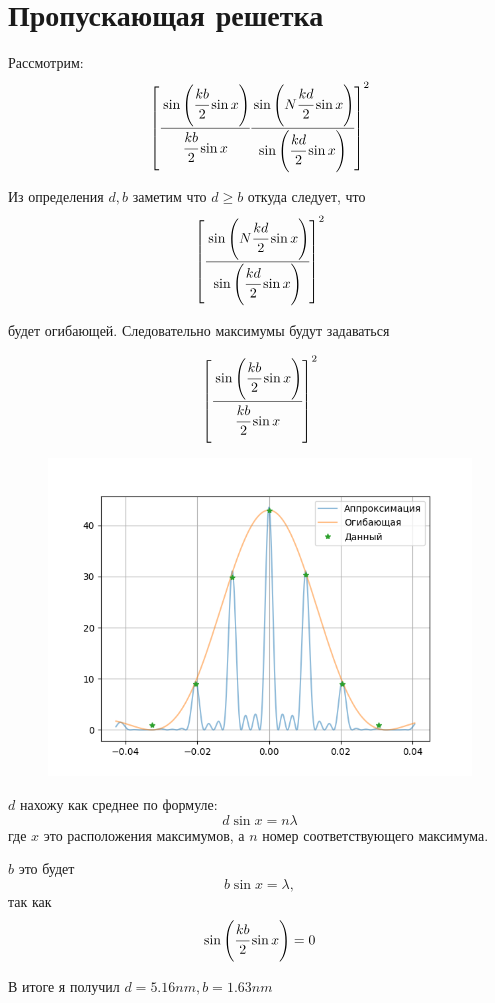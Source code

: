 \section{Пропускающая решетка}
Рассмотрим:
\begin{equation}
    \left[ \cfrac{\sin\left( \cfrac{kb}{2}\sin{x} \right)}{\cfrac{kb}{2}\sin{x}}
    \cfrac{\sin\left( N\cfrac{kd}{2}\sin{x} \right)}{\sin\left( \cfrac{kd}{2}\sin{x} \right)} \right]^2
\end{equation}

Из определения $d, b$ заметим что $d \geq b$ откуда следует, что
\begin{equation}
    \left[ \cfrac{\sin\left( N\cfrac{kd}{2}\sin{x} \right)}{\sin\left( \cfrac{kd}{2}\sin{x} \right)} \right]^2
\end{equation}

будет огибающей. Следовательно максимумы будут задаваться 

\begin{equation}
    \left[ \cfrac{\sin\left( \cfrac{kb}{2}\sin{x} \right)}{\cfrac{kb}{2}\sin{x}} \right]^2
\end{equation}

\begin{figure}[h]
    \centering
    \includegraphics[trim={0 0 0 0},clip,width=\textwidth]{Ex_2/ex_2_1.png}
    \caption{}
    \label{Ex_2_1}
\end{figure}

$d$ нахожу как среднее по формуле:
\begin{equation}
    d\sin{x} = n\lambda
\end{equation}
где $x$ это расположения максимумов, а $n$ номер соответствующего максимума.

$b$ это будет 
\begin{equation}
    b\sin{x} = \lambda,
\end{equation}
так как 
\begin{equation}
    \sin\left( \cfrac{kb}{2}\sin{x} \right) = 0
\end{equation}

В итоге я получил $d = 5.16 nm, b = 1.63 nm$